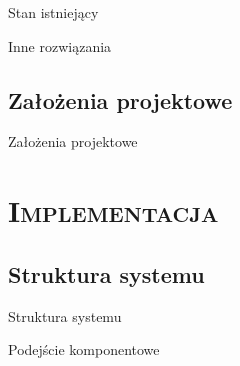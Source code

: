 \documentclass[xcolor=x11names,compress]{beamer}
\renewcommand{\(}{\begin{columns}}
\renewcommand{\)}{\end{columns}}
\newcommand{\<}[1]{\begin{column}{#1}}
\renewcommand{\>}{\end{column}}
\begin{document}
\begin{frame}{Stan istniejący}

\end{frame}


\begin{frame}{Inne rozwiązania}

\end{frame}

\subsection{Założenia projektowe}
\begin{frame}{Założenia projektowe}

\end{frame}

\section{\scshape Implementacja}
\subsection{Struktura systemu}
\begin{frame}{Struktura systemu}

\end{frame}

\begin{frame}{Podejście komponentowe}

\end{frame}
\end{document}
